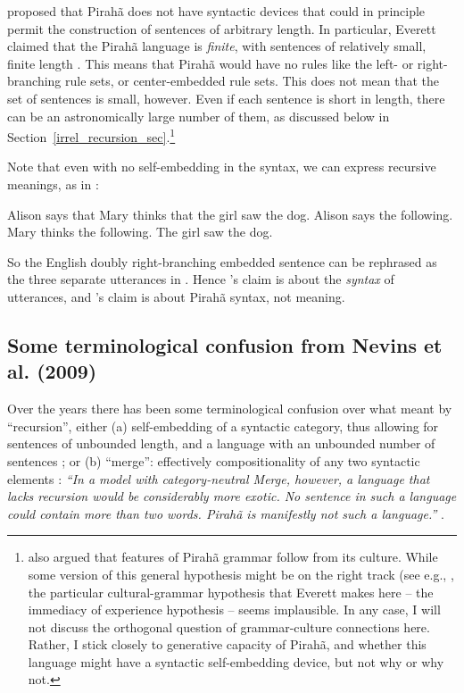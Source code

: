 \documentclass{article}
\begin{document}
\cite{everett2005cultural} proposed that Pirahã does not have syntactic devices that could in principle permit the construction of sentences of arbitrary length. In particular, Everett claimed that the Pirahã language is \textit{finite}, with sentences of relatively small, finite length \citep{everett2012does}. This means that Pirahã would have no rules like the left- or right-branching rule sets, or center-embedded rule sets.  This does not mean that the set of sentences is small, however.  Even if each sentence is short in length, there can be an astronomically large number of them, as discussed below in Section~\ref{irrel_recursion_sec}.\footnote{\cite{everett2005cultural} also argued that features of Pirahã grammar follow from its culture.  While some version of this general hypothesis might be on the right track (see e.g., \cite{gil2021tense}, the particular cultural-grammar hypothesis that Everett makes here -- the immediacy of experience hypothesis -- seems implausible.  In any case, I will not discuss the orthogonal question of grammar-culture connections here.  Rather, I stick closely to generative capacity of Pirahã, and whether this language might have a syntactic  self-embedding device, but not why or why not.}

Note that even with no self-embedding in the syntax, we can express recursive meanings, as in :

\eal
\label{rec_meaning}
\ex \label{rec_meaning1} Alison says that Mary thinks that the girl saw the dog.
\ex \label{rec_meaning2} Alison says the following. Mary thinks the following. The girl saw the dog.
\zl

\noindent
So the English doubly right-branching embedded sentence  can be rephrased as the three separate utterances in . 
 Hence \cite{hauser2002faculty}’s claim is about the \textit{syntax} of utterances, and \cite{everett2005cultural}’s claim is about Pirahã syntax, not meaning.

\subsection{Some terminological confusion from Nevins et al. (2009)}

Over the years there has been some terminological confusion over what \cite{hauser2002faculty} meant by ``recursion'', either (a) self-embedding of a syntactic category, thus allowing for sentences of unbounded length, and a language with an unbounded number of sentences \citep{everett2005cultural}; or (b) ``merge'': effectively compositionality of any two syntactic elements \citep{nevins2009evidence}: \textit{``In a model with category-neutral Merge, however, a language that lacks recursion would be considerably more exotic. No sentence in such a language could contain more than two words. Pirahã is manifestly not such a language.''} \citep[366]{nevins2009evidence}.
\end{document}
